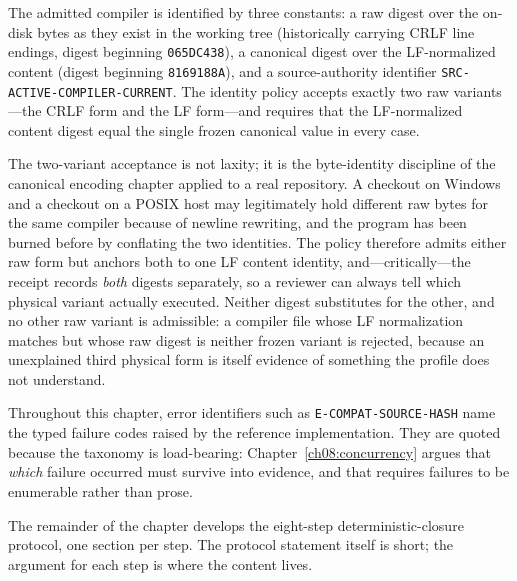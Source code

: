\begin{definition}\label{ch07:def:compiler-identity}
The admitted compiler is identified by three constants: a raw digest over the on-disk bytes as they exist in the working tree (historically carrying CRLF line endings, digest beginning \texttt{065DC438}), a canonical digest over the LF-normalized content (digest beginning \texttt{8169188A}), and a source-authority identifier \texttt{SRC-ACTIVE-COMPILER-CURRENT}. The identity policy accepts exactly two raw variants---the CRLF form and the LF form---and requires that the LF-normalized content digest equal the single frozen canonical value in every case.
\end{definition}

The two-variant acceptance is not laxity; it is the byte-identity discipline of the canonical encoding chapter applied to a real repository. A checkout on Windows and a checkout on a POSIX host may legitimately hold different raw bytes for the same compiler because of newline rewriting, and the program has been burned before by conflating the two identities. The policy therefore admits either raw form but anchors both to one LF content identity, and---critically---the receipt records \emph{both} digests separately, so a reviewer can always tell which physical variant actually executed. Neither digest substitutes for the other, and no other raw variant is admissible: a compiler file whose LF normalization matches but whose raw digest is neither frozen variant is rejected, because an unexplained third physical form is itself evidence of something the profile does not understand.

\begin{remark}
Throughout this chapter, error identifiers such as \texttt{E-COMPAT-SOURCE-HASH} name the typed failure codes raised by the reference implementation. They are quoted because the taxonomy is load-bearing: Chapter~\ref{ch08:concurrency} argues that \emph{which} failure occurred must survive into evidence, and that requires failures to be enumerable rather than prose.
\end{remark}

The remainder of the chapter develops the eight-step deterministic-closure protocol, one section per step. The protocol statement itself is short; the argument for each step is where the content lives.

